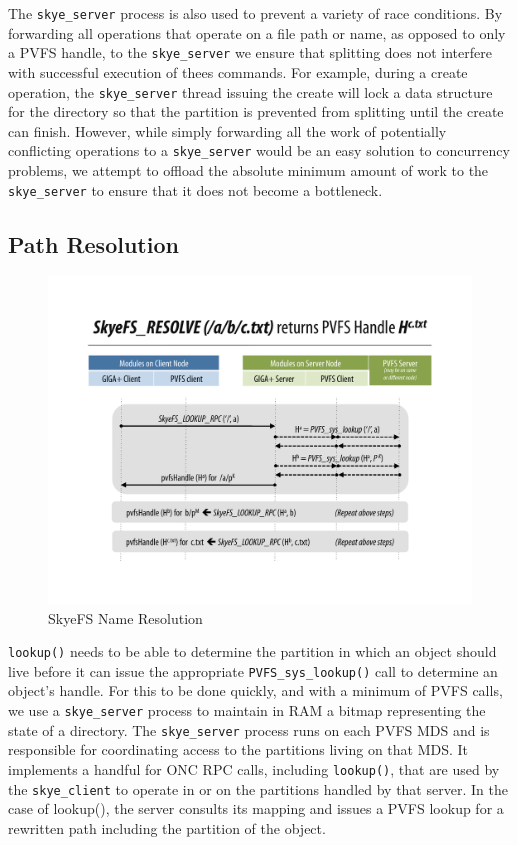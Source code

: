 \documentclass[twocolumn,letterpaper]{article}
\newcommand{\code}[1]{\texttt{#1}}
\begin{document}
The \code{skye\_\-server} process is also used to prevent a variety of race conditions.
By forwarding all operations that operate on a file path or name, as opposed to
only a PVFS handle, to the \code{skye\_\-server} we ensure that splitting does not
interfere with successful execution of thees commands.  For example, during a
create operation, the \code{skye\_\-server} thread issuing the create will lock a data
structure for the directory so that the partition is prevented from splitting
until the create can finish.  However, while simply forwarding all the work of
potentially conflicting operations to a \code{skye\_\-server} would be an easy solution to
concurrency problems, we attempt to offload the absolute minimum amount of work
to the \code{skye\_\-server} to ensure that it does not become a bottleneck.

\subsection{Path Resolution}
\begin{figure}
\begin{center}
\includegraphics[scale=0.4]{figure-resolve}
\end{center}
\caption{SkyeFS Name Resolution}
\end{figure}
\code{lookup()} needs to be able to determine the partition in which an object
should live before it can issue the appropriate \code{PVFS\_\-sys\_\-lookup()}
call to determine an object's handle.  For this to be done quickly, and with a
minimum of PVFS calls, we use a \code{skye\_\-server} process to maintain in
RAM a bitmap representing the state of a directory.  The \code{skye\_\-server}
process runs on each PVFS MDS and is responsible for coordinating access to
the partitions living on that MDS.  It implements a handful for ONC RPC calls,
including \code{lookup()}, that are used by the \code{skye\_\-client} to
operate in or on the partitions handled by that server.  In the case of
lookup(), the server consults its mapping and issues a PVFS lookup for a
rewritten path including the partition of the object.
\end{document}
